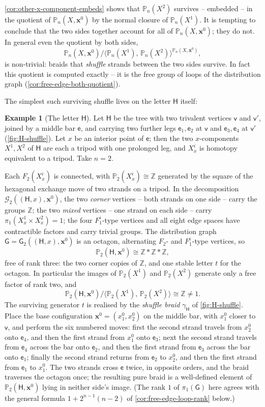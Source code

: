 \documentclass[reqno]{amsart}
\theoremstyle{definition}
\newtheorem{example}[theorem]{Example}
\newcommand\bfx{\mathbf{x}}
\newcommand\cG{\mathcal{G}}
\newcommand\sfG{\mathsf{G}}
\newcommand\sfH{\mathsf{H}}
\newcommand\sfe{\mathsf{e}}
\newcommand\sfv{\mathsf{v}}
\newcommand{\PB}{\mathbb{P}}
\newcommand{\Z}{\mathbb{Z}}
\newcommand{\co}[1]{\mathopen{\langle}#1\mathclose{\rangle}} %
\newcommand{\base}{\bfx^0}
\numberwithin{equation}{section}
\begin{document}
\cref{cor:other-x-component-embeds} shows that \(\PB_n(X^2)\)
survives -- embedded -- in the quotient of \(\PB_n(X,\base)\) by the
normal closure of \(\PB_n(X^1)\). It is tempting to conclude that
the two sides together account for all of \(\PB_n(X,\base)\); they
do not. In general even the quotient by both sides,
\[
\PB_n(X,\base)\big/
\co{\PB_n(X^1),\,\PB_n(X^2)}^{\PB_n(X,\base)},
\]
is non-trivial: braids that \emph{shuffle} strands between the two
sides survive. In fact this quotient is computed exactly -- it is
the free group of loops of the distribution graph
(\cref{cor:free-edge-both-quotient}).

The simplest such surviving shuffle lives on the letter
\(\sfH\) itself:

\begin{example}[The letter \(\sfH\)]
\label{ex:two-tripods-shuffle}
Let \(\sfH\) be the tree with two trivalent vertices \(\sfv\)
and \(\sfv'\), joined by a middle bar \(\sfe\), and carrying
two further legs \(\sfe_1,\sfe_2\) at \(\sfv\) and
\(\sfe_3,\sfe_4\) at \(\sfv'\) (\cref{fig:H-shuffle}). Let
\(x\) be an interior point of \(\sfe\); then the two
\(x\)-components \(X^1,X^2\) of \(\sfH\) are each a tripod with
one prolonged leg, and \(X^i_x\) is homotopy equivalent to a
tripod. Take \(n=2\).

Each \(F_2(X^i_x)\) is connected, with
\(\PB_2(X^i_x)\cong\Z\) generated by the square of the hexagonal
exchange move of two strands on a tripod. In the decomposition
\(\cG_2((\sfH,x),\base)\), the two \emph{corner} vertices -- both
strands on one side -- carry the groups \(\Z\); the two
\emph{mixed} vertices -- one strand on each side -- carry
\(\pi_1(X^1_x\times X^2_x)=1\); the four \(F^i_1\)-type vertices
and all eight edge spaces have contractible factors and carry
trivial groups. The distribution graph
\(\sfG=\sfG_2((\sfH,x),\base)\) is an octagon, alternating
\(F_2\)- and \(F^i_1\)-type vertices, so
\[
\PB_2(\sfH,\base)\cong\Z\ast\Z\ast\Z ,
\]
free of rank three: the two corner copies of \(\Z\), and one
stable letter \(t\) for the octagon. In particular the images of
\(\PB_2(X^1)\) and \(\PB_2(X^2)\) generate only a free factor of
rank two, and
\[
\PB_2(\sfH,\base)\big/\co{\PB_2(X^1),\,\PB_2(X^2)}\cong\Z\neq1 .
\]
The surviving generator \(t\) is realised by the \emph{shuffle
braid} \(\gamma_\sfH\) of \cref{fig:H-shuffle}. Place the base
configuration \(\base=(x^0_1,x^0_2)\) on the middle bar, with
\(x^0_1\) closer to \(\sfv\), and perform the six numbered
moves: first the second strand travels from \(x^0_2\) onto
\(\sfe_4\), and then the first strand from \(x^0_1\) onto
\(\sfe_3\); next the second strand travels from \(\sfe_4\)
across the bar onto \(\sfe_2\), and then the first strand from
\(\sfe_3\) across the bar onto \(\sfe_1\); finally the second
strand returns from \(\sfe_2\) to \(x^0_2\), and then the first
strand from \(\sfe_1\) to \(x^0_1\). The two strands cross
\(\sfe\) twice, in opposite orders, and the braid traverses the
octagon once; the resulting pure braid is a well-defined element
of \(\PB_2(\sfH,\base)\) lying in neither side's image. (The rank
\(1\) of \(\pi_1(\sfG)\) here agrees with the general formula
\(1+2^{n-1}(n-2)\) of \cref{cor:free-edge-loop-rank} below.)
\end{example}
\end{document}

